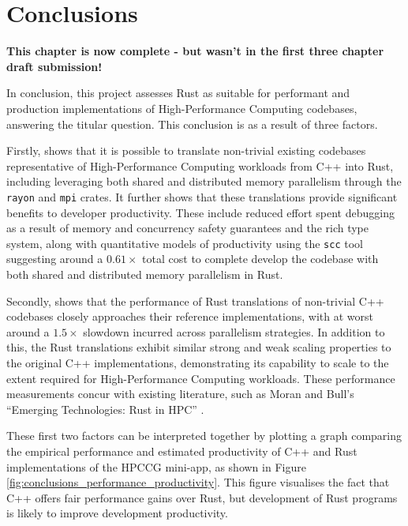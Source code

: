 \chapter{Conclusions}
\label{ch:conclusions}

\textbf{This chapter is now complete - but wasn't in the first three chapter draft submission!}

In conclusion, this project assesses Rust as suitable for performant and production implementations of High-Performance Computing codebases, answering the titular question. This conclusion is as a result of three factors.

Firstly,  shows that it is possible to translate non-trivial existing codebases representative of High-Performance Computing workloads from C++ into Rust, including leveraging both shared and distributed memory parallelism through the \texttt{rayon} and \texttt{mpi} crates. It further shows that these translations provide significant benefits to developer productivity. These include reduced effort spent debugging as a result of memory and concurrency safety guarantees and the rich type system, along with quantitative models of productivity using the \texttt{scc} tool suggesting around a $0.61 \times$ total cost to complete develop the codebase with both shared and distributed memory parallelism in Rust.

Secondly,  shows that the performance of Rust translations of non-trivial C++ codebases closely approaches their reference implementations, with at worst around a $1.5 \times$ slowdown incurred across parallelism strategies. In addition to this, the Rust translations exhibit similar strong and weak scaling properties to the original C++ implementations, demonstrating its capability to scale to the extent required for High-Performance Computing workloads. These performance measurements concur with existing literature, such as Moran and Bull's ``Emerging Technologies: Rust in HPC'' \cite{moranEmergingTechnologiesRust2023}.

These first two factors can be interpreted together by plotting a graph comparing the empirical performance and estimated productivity of C++ and Rust implementations of the HPCCG mini-app, as shown in Figure \ref{fig:conclusions_performance_productivity}. This figure visualises the fact that C++ offers fair performance gains over Rust, but development of Rust programs is likely to improve development productivity.

